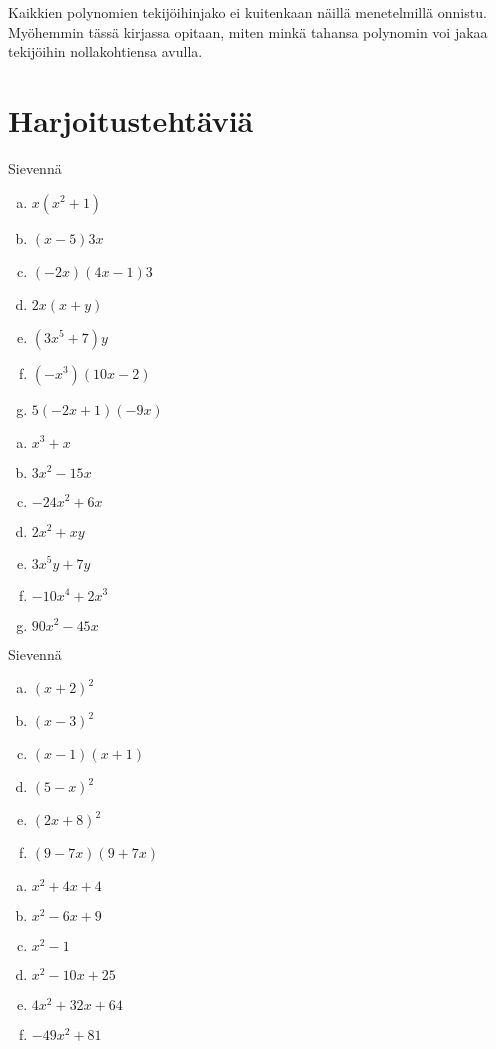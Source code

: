 Kaikkien polynomien tekijöihinjako ei kuitenkaan näillä menetelmillä onnistu.
Myöhemmin tässä kirjassa opitaan, miten minkä tahansa polynomin voi jakaa tekijöihin nollakohtiensa avulla.

\section{Harjoitustehtäviä}

\begin{tehtava}
    Sievennä
    \begin{enumerate}[a)]
        \item $x(x^2 + 1)$
        \item $(x - 5)3x$
        \item $(-2x)(4x - 1)3$
        \item $2x(x + y)$
        \item $(3x^5 + 7)y$
        \item $(-x^3)(10x - 2)$
        \item $5(-2x + 1)(-9x) $
    \end{enumerate}
    \begin{vastaus}
        \begin{enumerate}[a)]
            \item $x^3 + x$
            \item $3x^2 - 15x$
            \item $-24x^2 + 6x$
            \item $2x^2 + xy$
            \item $3x^5y + 7y$
            \item $-10x^4 + 2x^3$
            \item $90x^2 - 45x$
        \end{enumerate}
    \end{vastaus}
\end{tehtava}

\begin{tehtava}
    Sievennä
    \begin{enumerate}[a)]
        \item $(x+2)^2$
        \item $(x-3)^2$
        \item $(x-1)(x+1)$
        \item $(5-x)^2$
        \item $(2x + 8)^2$
        \item $(9 - 7x)(9 + 7x)$
    \end{enumerate}
    \begin{vastaus}
        \begin{enumerate}[a)]
            \item $x^2 + 4x + 4$
            \item $x^2 - 6x + 9$
            \item $x^2 - 1$
            \item $x^2 - 10x + 25$
            \item $4x^2 + 32x + 64$
            \item $-49x^2 + 81$
        \end{enumerate}
    \end{vastaus}
\end{tehtava}

